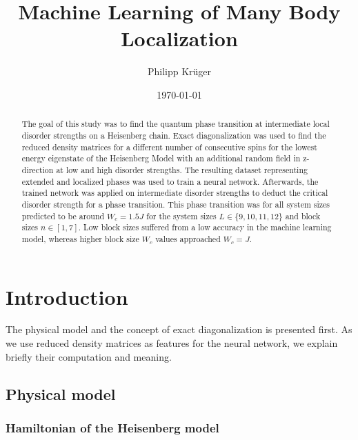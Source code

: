 \documentclass[reprint,amsmath,amssymb,aps,prb]{revtex4-2}
\begin{document}
%

\title{Machine Learning of Many Body Localization}

\author{Philipp Krüger}

\date{\today}%

\begin{abstract}
The goal of this study was to find the quantum phase transition at intermediate local disorder strengths on a Heisenberg chain. Exact diagonalization was used to find the reduced density matrices for a different number of consecutive spins for the lowest energy eigenstate of the Heisenberg Model with an additional random field in z-direction at low and high disorder strengths. The resulting dataset representing extended and localized phases was used to train a neural network. Afterwards, the trained network was applied on intermediate disorder strengths to deduct the critical disorder strength for a phase transition. This phase transition was for all system sizes predicted to be around $W_c = 1.5 J$ for the system sizes $L\in\{9, 10, 11, 12\}$ and block sizes $n\in\left[1,7\right]$. Low block sizes suffered from a low accuracy in the machine learning model, whereas higher block size $W_c$ values approached $W_c=J$.  %
\end{abstract}

\maketitle

\section{Introduction}

The physical model and the concept of exact diagonalization is presented first. As we use reduced density matrices as features for the neural network, we explain briefly their computation and meaning.
\subsection{Physical model}

\subsubsection{Hamiltonian of the Heisenberg model}
\end{document}
